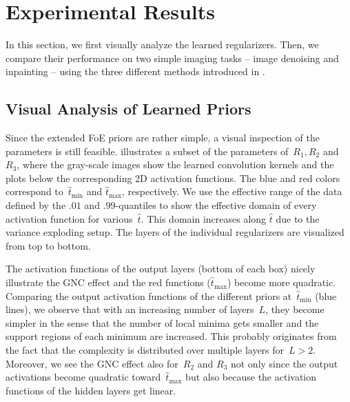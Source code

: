 \documentclass{article}
\def\hatt{{\widehat{t}}}
\newcommand{\tminh}{\hatt_\mathrm{min}}
\newcommand{\tmaxh}{\hatt_\mathrm{max}}
\theoremstyle{plain}
\theoremstyle{definition}
\theoremstyle{remark}
\begin{document}
\section{Experimental Results}
In this section, we first visually analyze the learned regularizers.
Then, we compare their performance on two simple imaging tasks -- image denoising and inpainting -- using the three different methods introduced in .

\subsection{Visual Analysis of Learned Priors}
Since the extended FoE priors are rather simple, a visual inspection of the parameters is still feasible.
 illustrates a subset of the parameters of~$R_1,R_2$ and $R_3$, where the gray-scale images show the learned convolution kernels and the plots below the corresponding 2D activation functions.
The blue and red colors correspond to~$\tminh$ and $\tmaxh$, respectively.
We use the effective range of the data defined by the $.01$ and $.99$-quantiles to show the effective domain of every activation function for various~$\hatt$.
This domain increases along $\hatt$ due to the variance exploding setup.
The layers of the individual regularizers are visualized from top to bottom.

The activation functions of the output layers (bottom of each box) nicely illustrate the GNC effect and the red functions ($\tmaxh$) become more quadratic.
Comparing the output activation functions of the different priors at~$\tminh$ (blue lines), we observe that with an increasing number of layers~$L$, they become simpler in the sense that the number of local minima gets smaller and the support regions of each minimum are increased.
This probably originates from the fact that the complexity is distributed over multiple layers for~$L>2$.
Moreover, we see the GNC effect also for~$R_2$ and $R_3$ not only since the output activations become quadratic toward~$\tmaxh$ but also because the activation functions of the hidden layers get linear.
\end{document}

